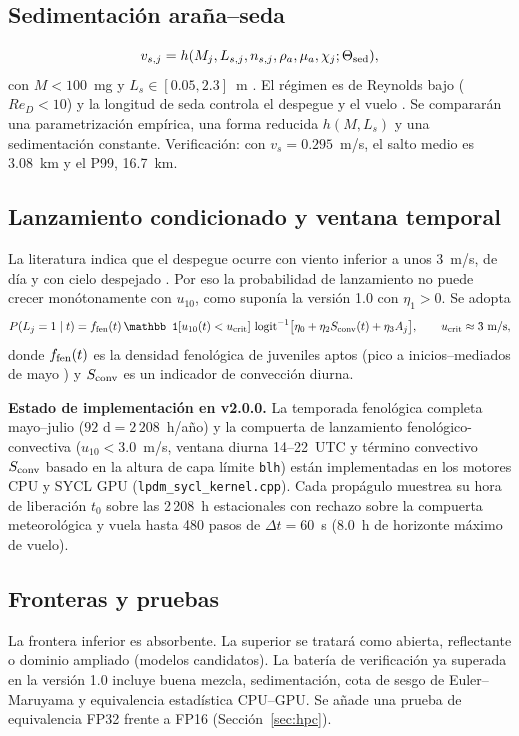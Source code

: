 \documentclass[11pt,letterpaper]{article}
\newcommand{\logit}{\operatorname{logit}}
\begin{document}
\subsection{Sedimentación araña--seda}
\begin{equation}v_{s,j}=h(M_j,L_{s,j},n_{s,j},\rho_a,\mu_a,\chi_j;\Theta_{\rm sed}),\end{equation}
con $M<100$~mg y $L_s\in[0.05,2.3]$~m \cite{sheldon2017,zhao2017}. El régimen es de Reynolds bajo ($Re_D<10$) y la longitud de seda controla el despegue y el vuelo \cite{zhao2017}. Se compararán una parametrización empírica, una forma reducida $h(M,L_s)$ y una sedimentación constante. Verificación: con $v_s=0.295$~m/s, el salto medio es 3.08~km y el P99, 16.7~km.

\subsection{Lanzamiento condicionado y ventana temporal}
La literatura indica que el despegue ocurre con viento inferior a unos 3~m/s, de día y con cielo despejado \cite{sheldon2017,zhao2017}. Por eso la probabilidad de lanzamiento no puede crecer monótonamente con $u_{10}$, como suponía la versión 1.0 con $\eta_1>0$. Se adopta
\begin{equation}
P(L_j=1\mid t)=f_{\rm fen}(t)\,\mathbb 1[u_{10}(t)<u_{\rm crit}]\,\logit^{-1}\!\big[\eta_0+\eta_2S_{\rm conv}(t)+\eta_3A_j\big],\qquad u_{\rm crit}\approx3~\text{m/s},
\end{equation}
donde $f_{\rm fen}(t)$ es la densidad fenológica de juveniles aptos (pico a inicios--mediados de mayo \cite{chuang2023}) y $S_{\rm conv}$ es un indicador de convección diurna.

\textbf{Estado de implementación en v2.0.0.} La temporada fenológica completa mayo--julio ($92\text{ d}=2\,208$~h/año) y la compuerta de lanzamiento fenológico-convectiva ($u_{10}<3.0$~m/s, ventana diurna 14--22~UTC y término convectivo $S_{\rm conv}$ basado en la altura de capa límite \texttt{blh}) están implementadas en los motores CPU y SYCL GPU (\texttt{lpdm\_sycl\_kernel.cpp}). Cada propágulo muestrea su hora de liberación $t_0$ sobre las 2\,208~h estacionales con rechazo sobre la compuerta meteorológica y vuela hasta 480 pasos de $\Delta t=60$~s ($8.0$~h de horizonte máximo de vuelo).

\subsection{Fronteras y pruebas}
La frontera inferior es absorbente. La superior se tratará como abierta, reflectante o dominio ampliado (modelos candidatos). La batería de verificación ya superada en la versión 1.0 incluye buena mezcla, sedimentación, cota de sesgo de Euler--Maruyama y equivalencia estadística CPU--GPU. Se añade una prueba de equivalencia FP32 frente a FP16 (Sección~\ref{sec:hpc}).
\end{document}
